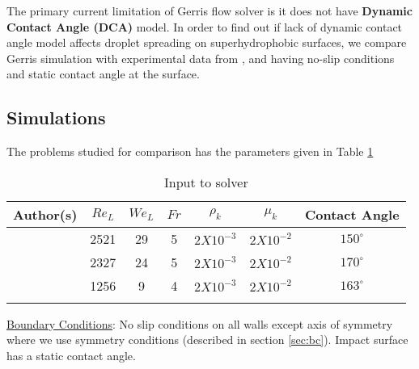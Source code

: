 The primary current limitation of Gerris flow solver is it does not have \textbf{Dynamic Contact Angle (DCA)} model. In order to find out if lack of dynamic contact angle model affects 
droplet spreading on superhydrophobic surfaces, we compare Gerris simulation with experimental data from \cite{Hung2011}, \cite{Clanet2004} and \cite{Wang2007}
having no-slip conditions and static contact angle at the surface.

\subsection{Simulations}

The problems studied for comparison has the parameters given in Table \ref{parameters} \\

 \begin{table}[H]
  \begin{center}
    \begin{tabular}{ccccccc}
      \toprule 
      Author(s) & $Re_L$ & $We_L$ & $Fr$ & $\rho_k$ & $\mu_k$ & Contact Angle \\ 
      \midrule
      \cite{Hung2011} & 2521 & 29 & 5 & $2 X 10^{-3}$ &  $2 X 10^{-2}$ & $150^{\circ}$ \\
       \cite{Clanet2004} & 2327 & 24 & 5 & $2 X 10^{-3}$ &  $2 X 10^{-2}$ & $170^{\circ}$ \\
        \cite{Wang2007} & 1256 & 9 & 4 & $2 X 10^{-3}$ &  $2 X 10^{-2}$ & $163^{\circ}$\\
      \bottomrule \\
    \end{tabular}
       \caption{Input to solver}
 \label{parameters}
  \end{center}
\end{table}

\underline{Boundary Conditions}: No slip conditions on all walls except axis of symmetry where we use symmetry conditions (described in section \ref{sec:bc}). Impact surface
has a static contact angle.
